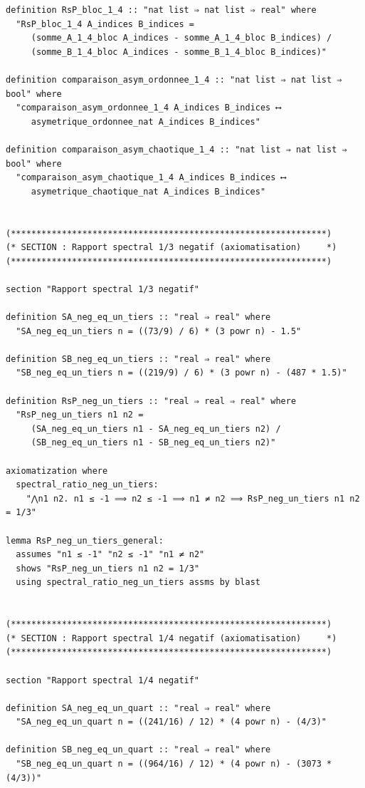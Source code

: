 \documentclass[a4paper,11pt]{article}
\begin{document}
\begin{holcode}[title={\textcolor{white}{Fichier : methode\_spectral.thy -- Partie 5/6}}]
\begin{lstlisting}
definition RsP_bloc_1_4 :: "nat list ⇒ nat list ⇒ real" where
  "RsP_bloc_1_4 A_indices B_indices =
     (somme_A_1_4_bloc A_indices - somme_A_1_4_bloc B_indices) /
     (somme_B_1_4_bloc A_indices - somme_B_1_4_bloc B_indices)"

definition comparaison_asym_ordonnee_1_4 :: "nat list ⇒ nat list ⇒ bool" where
  "comparaison_asym_ordonnee_1_4 A_indices B_indices ⟷
     asymetrique_ordonnee_nat A_indices B_indices"

definition comparaison_asym_chaotique_1_4 :: "nat list ⇒ nat list ⇒ bool" where
  "comparaison_asym_chaotique_1_4 A_indices B_indices ⟷
     asymetrique_chaotique_nat A_indices B_indices"


(**************************************************************)
(* SECTION : Rapport spectral 1/3 negatif (axiomatisation)     *)
(**************************************************************)

section "Rapport spectral 1/3 negatif"

definition SA_neg_eq_un_tiers :: "real ⇒ real" where
  "SA_neg_eq_un_tiers n = ((73/9) / 6) * (3 powr n) - 1.5"

definition SB_neg_eq_un_tiers :: "real ⇒ real" where
  "SB_neg_eq_un_tiers n = ((219/9) / 6) * (3 powr n) - (487 * 1.5)"

definition RsP_neg_un_tiers :: "real ⇒ real ⇒ real" where
  "RsP_neg_un_tiers n1 n2 =
     (SA_neg_eq_un_tiers n1 - SA_neg_eq_un_tiers n2) /
     (SB_neg_eq_un_tiers n1 - SB_neg_eq_un_tiers n2)"

axiomatization where
  spectral_ratio_neg_un_tiers:
    "⋀n1 n2. n1 ≤ -1 ⟹ n2 ≤ -1 ⟹ n1 ≠ n2 ⟹ RsP_neg_un_tiers n1 n2 = 1/3"

lemma RsP_neg_un_tiers_general:
  assumes "n1 ≤ -1" "n2 ≤ -1" "n1 ≠ n2"
  shows "RsP_neg_un_tiers n1 n2 = 1/3"
  using spectral_ratio_neg_un_tiers assms by blast


(**************************************************************)
(* SECTION : Rapport spectral 1/4 negatif (axiomatisation)     *)
(**************************************************************)

section "Rapport spectral 1/4 negatif"

definition SA_neg_eq_un_quart :: "real ⇒ real" where
  "SA_neg_eq_un_quart n = ((241/16) / 12) * (4 powr n) - (4/3)"

definition SB_neg_eq_un_quart :: "real ⇒ real" where
  "SB_neg_eq_un_quart n = ((964/16) / 12) * (4 powr n) - (3073 * (4/3))"


\end{lstlisting}
\end{holcode}
\end{document}
